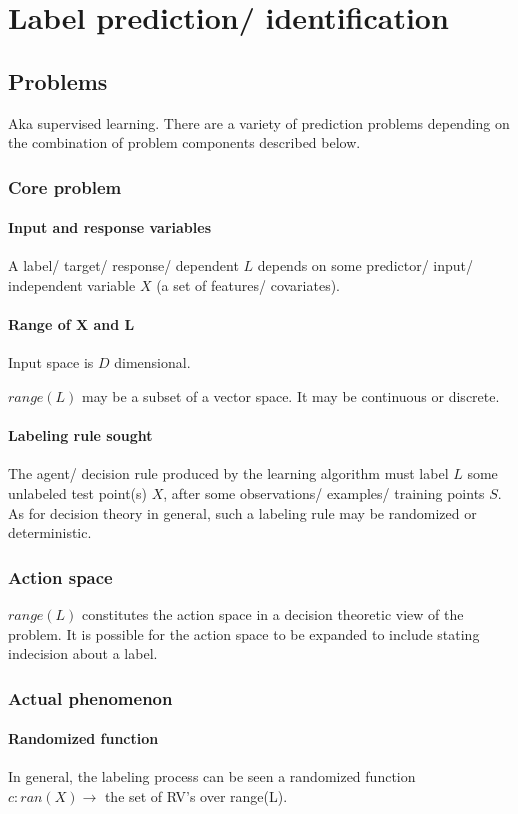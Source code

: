 \documentclass[oneside, article]{memoir}
\begin{document}
\part{Label prediction/ identification}
\chapter{Problems}
Aka supervised learning. There are a variety of prediction problems depending on the combination of problem components described below.

\section{Core problem}
\subsection{Input and response variables}
A label/ target/ response/ dependent $L$ depends on some predictor/ input/ independent variable $X$ (a set of features/ covariates).

\subsection{Range of X and L}
Input space is $D$ dimensional.

$range(L)$ may be a subset of a vector space. It may be continuous or discrete.

\subsection{Labeling rule sought}
The agent/ decision rule produced by the learning algorithm must label $L$ some unlabeled test point(s) $X$, after some observations/ examples/ training points $S$. As for decision theory in general, such a labeling rule may be randomized or deterministic.

\section{Action space}
$range(L)$ constitutes the action space in a decision theoretic view of the problem. It is possible for the action space to be expanded to include stating indecision about a label.

\section{Actual phenomenon}
\subsection{Randomized function}
In general, the labeling process can be seen a randomized function $c:ran(X) \to $ the set of RV's over range(L).
\end{document}
